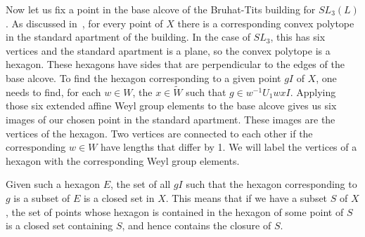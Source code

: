 \documentclass{amsart}
\theoremstyle{definition}
\def\W{\widetilde{W}}
\begin{document}
  Now let us fix a point in the base alcove of the Bruhat-Tits building for
  $SL_3(L)$.  As discussed in~\cite{Kottwitz-Harmonic-Analysis}, for every
  point of $X$ there is a corresponding convex polytope in the standard
  apartment of the building.  In the case of $SL_3$, this has six vertices and
  the standard apartment is a plane, so the convex polytope is a hexagon.
  These hexagons have sides that are perpendicular to the edges of the base
  alcove.  To find the hexagon corresponding to a given point $gI$ of $X$, one
  needs to find, for each $w \in W$, the $x \in \W$ such that $g \in w^{-1}U_1w
  x I$.  Applying those six extended affine Weyl group elements to the base
  alcove gives us six images of our chosen point in the standard apartment.
  These images are the vertices of the hexagon.  Two vertices are connected to
  each other if the corresponding $w \in W$ have lengths that differ by 1.  We
  will label the vertices of a hexagon with the corresponding Weyl group
  elements.

  Given such a hexagon $E$, the set of all $gI$ such that the hexagon
  corresponding to $g$ is a subset of $E$ is a closed set in $X$.  This means
  that if we have a subset $S$ of $X$, the set of points whose hexagon is
  contained in the hexagon of some point of $S$ is a closed set containing $S$,
  and hence contains the closure of $S$.
\end{document}
